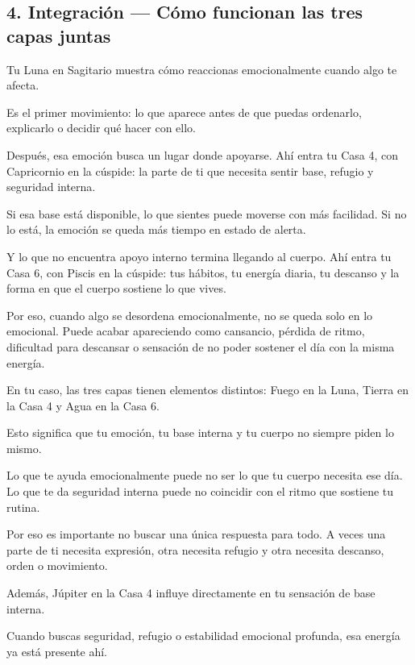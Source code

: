 \documentclass[11pt,a4paper]{article}
\begin{document}
\vspace{0.8cm}

\subsection{4. Integración — Cómo funcionan las tres capas juntas}

Tu Luna en Sagitario muestra cómo reaccionas emocionalmente cuando algo te afecta.

Es el primer movimiento: lo que aparece antes de que puedas ordenarlo, explicarlo o decidir qué hacer con ello.

Después, esa emoción busca un lugar donde apoyarse. Ahí entra tu Casa 4, con Capricornio en la cúspide: la parte de ti que necesita sentir base, refugio y seguridad interna.

Si esa base está disponible, lo que sientes puede moverse con más facilidad.
Si no lo está, la emoción se queda más tiempo en estado de alerta.

Y lo que no encuentra apoyo interno termina llegando al cuerpo. Ahí entra tu Casa 6, con Piscis en la cúspide: tus hábitos, tu energía diaria, tu descanso y la forma en que el cuerpo sostiene lo que vives.

Por eso, cuando algo se desordena emocionalmente, no se queda solo en lo emocional. Puede acabar apareciendo como cansancio, pérdida de ritmo, dificultad para descansar o sensación de no poder sostener el día con la misma energía.

En tu caso, las tres capas tienen elementos distintos: Fuego en la Luna, Tierra en la Casa 4 y Agua en la Casa 6.

Esto significa que tu emoción, tu base interna y tu cuerpo no siempre piden lo mismo.

Lo que te ayuda emocionalmente puede no ser lo que tu cuerpo necesita ese día. Lo que te da seguridad interna puede no coincidir con el ritmo que sostiene tu rutina.

Por eso es importante no buscar una única respuesta para todo. A veces una parte de ti necesita expresión, otra necesita refugio y otra necesita descanso, orden o movimiento.

Además, Júpiter en la Casa 4 influye directamente en tu sensación de base interna.

Cuando buscas seguridad, refugio o estabilidad emocional profunda, esa energía ya está presente ahí.
\end{document}

